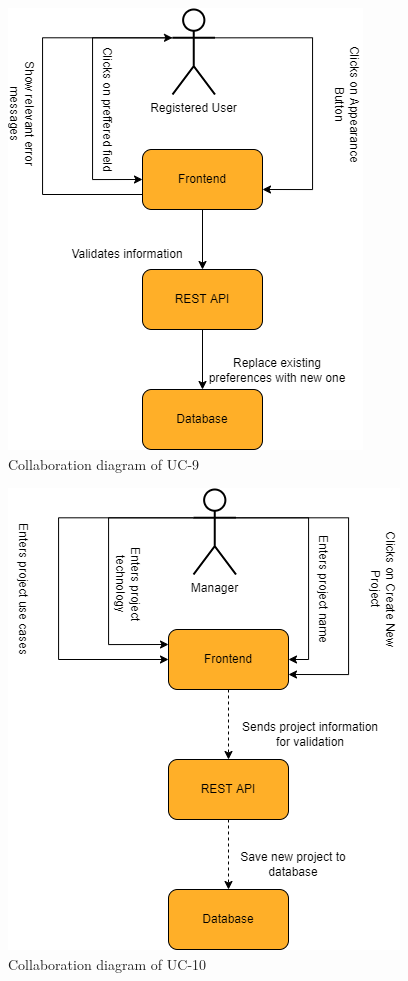 \begin{figure}[H]
    \centering
    \includegraphics[scale=0.5]{./diagrams/collaboration/cd-9.png}
    \caption{Collaboration diagram of UC-9}
    \label{fig:cd-09}
    
\end{figure}


\begin{figure}[H]
    \centering
    \includegraphics[scale=0.5]{./diagrams/collaboration/cd-10.png}
    \caption{Collaboration diagram of UC-10}
    \label{fig:cd-10}
    
\end{figure}


